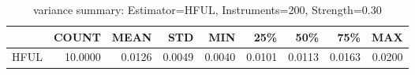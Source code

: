 \begin{table}[ht]
\centering
\caption{variance summary: Estimator=HFUL, Instruments=200, Strength=0.30}
\begin{tabular}{lrrrrrrrr}
\toprule
 & COUNT & MEAN & STD & MIN & 25\% & 50\% & 75\% & MAX \\
\midrule
HFUL & 10.0000 & 0.0126 & 0.0049 & 0.0040 & 0.0101 & 0.0113 & 0.0163 & 0.0200 \\
\bottomrule
\end{tabular}
\end{table}

